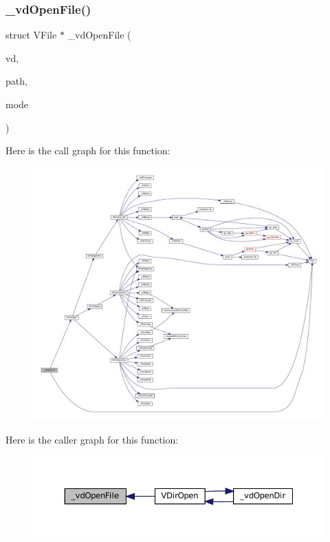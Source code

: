 \subsubsection{\texorpdfstring{\+\_\+vd\+Open\+File()}{\_vdOpenFile()}}
{\footnotesize\ttfamily struct V\+File $\ast$ \+\_\+vd\+Open\+File (\begin{DoxyParamCaption}\item[{struct V\+Dir $\ast$}]{vd,  }\item[{const char $\ast$}]{path,  }\item[{\mbox{\hyperlink{ioapi_8h_a787fa3cf048117ba7123753c1e74fcd6}{int}}}]{mode }\end{DoxyParamCaption})\hspace{0.3cm}{\ttfamily [static]}}

Here is the call graph for this function\+:
\nopagebreak
\begin{figure}[H]
\begin{center}
\leavevmode
\includegraphics[width=350pt]{vfs-dirent_8c_af98a3b7223717a0c978ed248a6f0310b_cgraph}
\end{center}
\end{figure}
Here is the caller graph for this function\+:
\nopagebreak
\begin{figure}[H]
\begin{center}
\leavevmode
\includegraphics[width=350pt]{vfs-dirent_8c_af98a3b7223717a0c978ed248a6f0310b_icgraph}
\end{center}
\end{figure}
\mbox{\label{vfs-dirent_8c_ac13693dbfa8a872101cf5d88b66ab87f}} 
